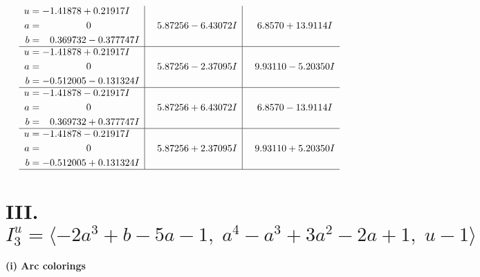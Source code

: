 \documentclass[1p]{elsarticle_modified}
\theoremstyle{definition}
\begin{document}
$$\begin{array}{c|c|c}
\begin{aligned}
u &= -1.41878 + 0.21917 I \\
a &= \phantom{-0.000000 } 0 \\
b &= \phantom{-}0.369732 - 0.377747 I\end{aligned}
 & \phantom{-}5.87256 - 6.43072 I & \phantom{-}6.8570 + 13.9114 I \\ \hline\begin{aligned}
u &= -1.41878 + 0.21917 I \\
a &= \phantom{-0.000000 } 0 \\
b &= -0.512005 - 0.131324 I\end{aligned}
 & \phantom{-}5.87256 - 2.37095 I & \phantom{-}9.93110 - 5.20350 I \\ \hline\begin{aligned}
u &= -1.41878 - 0.21917 I \\
a &= \phantom{-0.000000 } 0 \\
b &= \phantom{-}0.369732 + 0.377747 I\end{aligned}
 & \phantom{-}5.87256 + 6.43072 I & \phantom{-}6.8570 - 13.9114 I \\ \hline\begin{aligned}
u &= -1.41878 - 0.21917 I \\
a &= \phantom{-0.000000 } 0 \\
b &= -0.512005 + 0.131324 I\end{aligned}
 & \phantom{-}5.87256 + 2.37095 I & \phantom{-}9.93110 + 5.20350 I\\
 \hline 
 \end{array}$$\newpage\newpage\renewcommand{\arraystretch}{1}
\centering \section*{III. $I^u_{3}= \langle -2 a^3+b-5 a-1,\;a^4- a^3+3 a^2-2 a+1,\;u-1 \rangle$}
\flushleft \textbf{(i) Arc colorings}\\
\end{document}
